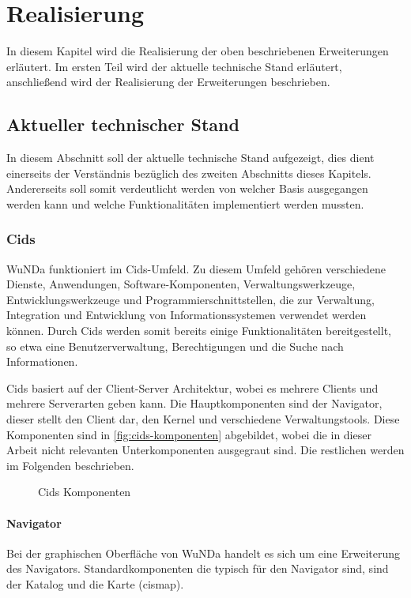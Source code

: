 \chapter{Realisierung} \label{ch:realisierung}

In diesem Kapitel wird die Realisierung der oben beschriebenen Erweiterungen erläutert.
Im ersten Teil wird der aktuelle technische Stand erläutert, anschließend wird der Realisierung der Erweiterungen beschrieben. 

\section{Aktueller technischer Stand}

In diesem Abschnitt soll der aktuelle technische Stand aufgezeigt, dies dient einerseits der Verständnis bezüglich des zweiten Abschnitts dieses Kapitels.
Andererseits soll somit verdeutlicht werden von welcher Basis ausgegangen werden kann und welche Funktionalitäten implementiert werden mussten.

\subsection{Cids}
\ac{WuNDa} funktioniert im Cids-Umfeld. Zu diesem Umfeld gehören verschiedene Dienste, Anwendungen, Software-Komponenten, Verwaltungswerkzeuge, Entwicklungswerkzeuge und Programmierschnittstellen, die zur Verwaltung, Integration und Entwicklung von Informationssystemen verwendet werden können.
Durch Cids werden somit bereits einige Funktionalitäten bereitgestellt, so etwa eine Benutzerverwaltung, Berechtigungen und die Suche nach Informationen. 

Cids basiert auf der Client-Server Architektur, wobei es mehrere Clients und mehrere Serverarten geben kann. Die Hauptkomponenten sind der Navigator, dieser stellt den Client dar, den Kernel und verschiedene Verwaltungstools. Diese Komponenten sind in \vref{fig:cids-komponenten} abgebildet, wobei die in dieser Arbeit nicht relevanten Unterkomponenten ausgegraut sind. Die restlichen werden im Folgenden beschrieben.

\begin{figure}[htb]
	\centering
	\caption{Cids Komponenten}
	\label{fig:cids-komponenten}
\end{figure}

\subsubsection{Navigator}
Bei der graphischen Oberfläche von \ac{WuNDa} handelt es sich um eine Erweiterung des Navigators.
Standardkomponenten die typisch für den Navigator sind, sind der Katalog und die Karte (cismap).

